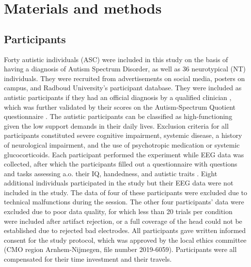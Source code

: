 \section{Materials and methods}

\subsection{Participants}
Forty autistic individuals (ASC) were included in this study on the basis of having a diagnosis of Autism Spectrum Disorder, as well as 36 neurotypical (NT) individuals. They were recruited from advertisements on social media, posters on campus, and Radboud University's participant database. They were included as autistic participants if they had an official diagnosis by a qualified clinician \citep{apa2013}, which was further validated by their scores on the Autism-Spectrum Quotient questionnaire \citep[AQ]{baron-cohen2001AQ}. The autistic participants can be classified as high-functioning given the low support demands in their daily lives. Exclusion criteria for all participants constituted severe cognitive impairment, systemic disease, a history of neurological impairment, and the use of psychotropic medication or systemic glucocorticoids. Each participant performed the experiment while EEG data was collected, after which the participants filled out a questionnaire with questions and tasks assessing a.o. their IQ, handedness, and autistic traits \citep{baron-cohen2001AQ,raven1989,veale2014}. Eight additional individuals participated in the study but their EEG data were not included in the study. The data of four of these participants were excluded due to technical malfunctions during the session. The other four participants' data were excluded due to poor data quality, for which less than 20 trials per condition were included after artifact rejection, or a full coverage of the head could not be established due to rejected bad electrodes. All participants gave written informed consent for the study protocol, which was approved by the local ethics committee (CMO region Arnhem-Nijmegen, file number 2019-6059). Participants were all compensated for their time investment and their travels.

